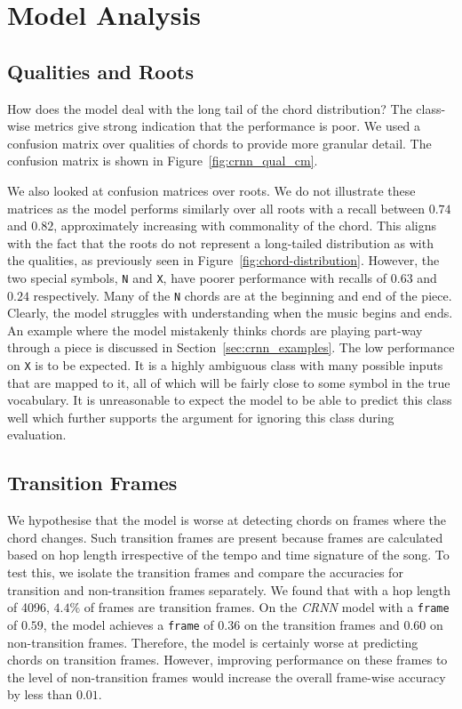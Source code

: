 \section{Model Analysis}

\subsection{Qualities and Roots}

How does the model deal with the long tail of the chord distribution? The class-wise metrics give strong indication that the performance is poor. We used a confusion matrix over qualities of chords to provide more granular detail. The confusion matrix is shown in Figure~\ref{fig:crnn_qual_cm}. 

We also looked at confusion matrices over roots. We do not illustrate these matrices as the model performs similarly over all roots with a recall between $0.74$ and $0.82$, approximately increasing with commonality of the chord. This aligns with the fact that the roots do not represent a long-tailed distribution as with the qualities, as previously seen in Figure~\ref{fig:chord-distribution}. However, the two special symbols, \texttt{N} and \texttt{X}, have poorer performance with recalls of $0.63$ and $0.24$ respectively. Many of the \texttt{N} chords are at the beginning and end of the piece. Clearly, the model struggles with understanding when the music begins and ends. An example where the model mistakenly thinks chords are playing part-way through a piece is discussed in Section~\ref{sec:crnn_examples}. The low performance on \texttt{X} is to be expected. It is a highly ambiguous class with many possible inputs that are mapped to it, all of which will be fairly close to some symbol in the true vocabulary. It is unreasonable to expect the model to be able to predict this class well which further supports the argument for ignoring this class during evaluation.


\subsection{Transition Frames}\label{sec:transition_frames}

We hypothesise that the model is worse at detecting chords on frames where the chord changes. Such transition frames are present because frames are calculated based on hop length irrespective of the tempo and time signature of the song. To test this, we isolate the transition frames and compare the accuracies for transition and non-transition frames separately. We found that with a hop length of 4096, $4.4\%$ of frames are transition frames. On the \emph{CRNN} model with a \texttt{frame} of $0.59$, the model achieves a \texttt{frame} of $0.36$ on the transition frames and $0.60$ on non-transition frames. Therefore, the model is certainly worse at predicting chords on transition frames. However, improving performance on these frames to the level of non-transition frames would increase the overall frame-wise accuracy by less than $0.01$. 


